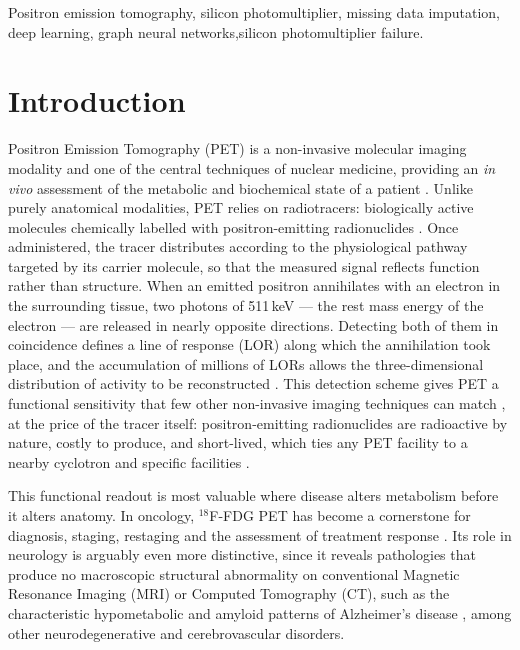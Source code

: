 \documentclass[10pt,conference]{IEEEtran}
\begin{document}
\begin{IEEEkeywords}
Positron emission tomography, silicon photomultiplier, missing data
imputation, deep learning, graph neural networks,silicon photomultiplier failure.
\end{IEEEkeywords}


\section{Introduction}


Positron Emission Tomography (PET) is a non-invasive molecular imaging
modality and one of the central techniques of nuclear medicine, providing
an \textit{in vivo} assessment of the metabolic and biochemical state of a
patient \cite{cherry2012}. Unlike purely anatomical modalities, PET relies
on radiotracers: biologically active molecules chemically labelled with
positron-emitting radionuclides \cite{rong2023}. Once administered, the
tracer distributes according to the physiological pathway targeted by its
carrier molecule, so that the measured signal reflects function rather than
structure. When an emitted positron annihilates with an electron in the
surrounding tissue, two photons of 511\,keV --- the rest mass energy of the
electron --- are released in nearly opposite directions. Detecting both of
them in coincidence defines a line of response (LOR) along which the
annihilation took place, and the accumulation of millions of LORs allows the
three-dimensional distribution of activity to be reconstructed
\cite{cherry2012}. This detection scheme gives PET a functional sensitivity that few other non-invasive imaging techniques can match \cite{vaquero2015}, at the
price of the tracer itself: positron-emitting radionuclides are radioactive
by nature, costly to produce, and short-lived, which ties any PET facility
to a nearby cyclotron and specific facilities \cite{rong2023}.

This functional readout is most valuable where disease alters metabolism
before it alters anatomy. In oncology, $^{18}$F-FDG PET has become a
cornerstone for diagnosis, staging, restaging and the assessment of
treatment response \cite{fletcher2008,boellaard2015}. Its role in neurology
is arguably even more distinctive, since it reveals pathologies that produce
no macroscopic structural abnormality on conventional Magnetic Resonance
Imaging (MRI) or Computed Tomography (CT), such as the characteristic
hypometabolic and amyloid patterns of Alzheimer's disease
\cite{johnson2013}, among other neurodegenerative and cerebrovascular
disorders.
\end{document}
